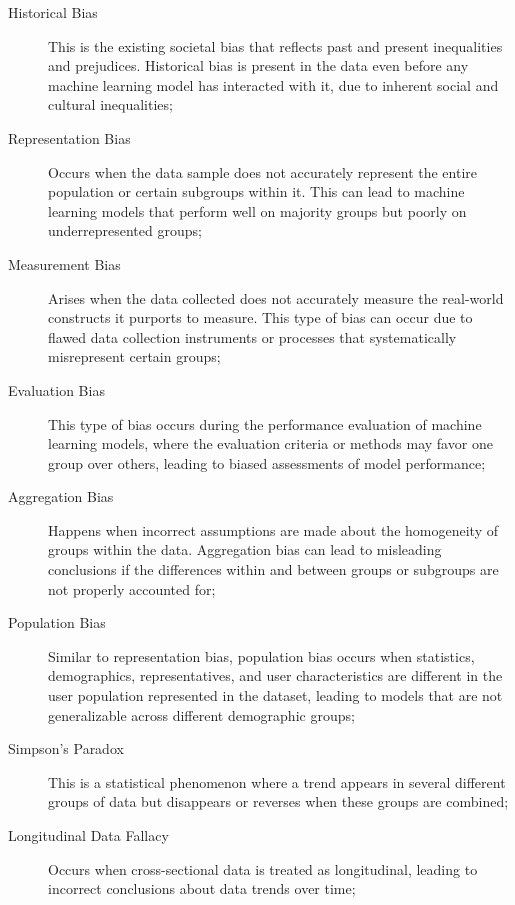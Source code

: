 \begin{description}
    \item[Historical Bias] This is the existing societal bias that reflects past and present inequalities and prejudices. Historical bias is present in the data even before any machine learning model has interacted with it, due to inherent social and cultural inequalities;
    
    \item[Representation Bias] Occurs when the data sample does not accurately represent the entire population or certain subgroups within it. This can lead to machine learning models that perform well on majority groups but poorly on underrepresented groups;

    \item[Measurement Bias] Arises when the data collected does not accurately measure the real-world constructs it purports to measure. This type of bias can occur due to flawed data collection instruments or processes that systematically misrepresent certain groups;
    
    \item[Evaluation Bias] This type of bias occurs during the performance evaluation of machine learning models, where the evaluation criteria or methods may favor one group over others, leading to biased assessments of model performance;

    \item[Aggregation Bias] Happens when incorrect assumptions are made about the homogeneity of groups within the data. Aggregation bias can lead to misleading conclusions if the differences within and between groups or subgroups are not properly accounted for;
    
    \item[Population Bias] Similar to representation bias, population bias occurs when statistics, demographics, representatives, and user characteristics are different in the user population represented in the dataset, leading to models that are not generalizable across different demographic groups;

    \item[Simpson’s Paradox] This is a statistical phenomenon where a trend appears in several different groups of data but disappears or reverses when these groups are combined;

    \item[Longitudinal Data Fallacy] Occurs when cross-sectional data is treated as longitudinal, leading to incorrect conclusions about data trends over time;


\end{description}

